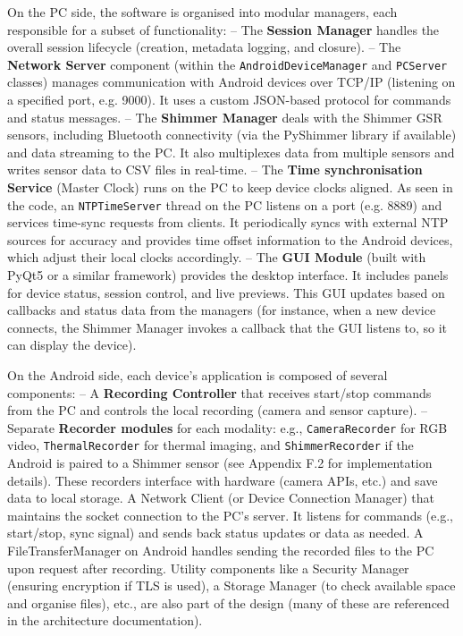 On the PC side, the software is organised into modular managers, each responsible for a subset of functionality: -- The \textbf{Session Manager} handles the overall session lifecycle (creation, metadata logging, and closure). -- The \textbf{Network Server} component (within the \texttt{AndroidDeviceManager} and \texttt{PCServer} classes) manages communication with Android devices over TCP/IP (listening on a specified port, e.g. 9000). It uses a custom JSON-based protocol for commands and status messages. -- The \textbf{Shimmer Manager} deals with the Shimmer GSR sensors, including Bluetooth connectivity (via the PyShimmer library if available) and data streaming to the PC. It also multiplexes data from multiple sensors and writes sensor data to CSV files in real-time. -- The \textbf{Time synchronisation Service} (Master Clock) runs on the PC to keep device clocks aligned. As seen in the code, an \texttt{NTPTimeServer} thread on the PC listens on a port (e.g. 8889) and services time-sync requests from clients. It periodically syncs with external NTP sources for accuracy and provides time offset information to the Android devices, which adjust their local clocks accordingly. -- The \textbf{GUI Module} (built with PyQt5 or a similar framework) provides the desktop interface. It includes panels for device status, session control, and live previews. This GUI updates based on callbacks and status data from the managers (for instance, when a new device connects, the Shimmer Manager invokes a callback that the GUI listens to, so it can display the device).

On the Android side, each device's application is composed of several components: -- A \textbf{Recording Controller} that receives start/stop commands from the PC and controls the local recording (camera and sensor capture). -- Separate \textbf{Recorder modules} for each modality: e.g., \texttt{CameraRecorder} for RGB video, \texttt{ThermalRecorder} for thermal imaging, and \texttt{ShimmerRecorder} if the Android is paired to a Shimmer sensor (see Appendix F.2 for implementation details). These recorders interface with hardware (camera APIs, etc.) and save data to local storage. A Network Client (or Device Connection Manager) that maintains the socket connection to the PC's server. It listens for commands (e.g., start/stop, sync signal) and sends back status updates or data as needed. A FileTransferManager on Android handles sending the recorded files to the PC upon request after recording. Utility components like a Security Manager (ensuring encryption if TLS is used), a Storage Manager (to check available space and organise files), etc., are also part of the design (many of these are referenced in the architecture documentation).

